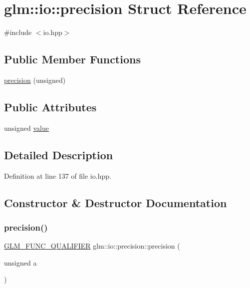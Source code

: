 \hypertarget{structglm_1_1io_1_1precision}{}\section{glm\+:\+:io\+:\+:precision Struct Reference}
\label{structglm_1_1io_1_1precision}


{\ttfamily \#include $<$io.\+hpp$>$}

\subsection*{Public Member Functions}
\begin{DoxyCompactItemize}
\item 
\hyperlink{structglm_1_1io_1_1precision_aa359e1766fd74b88e049d5449d521447}{precision} (unsigned)
\end{DoxyCompactItemize}
\subsection*{Public Attributes}
\begin{DoxyCompactItemize}
\item 
unsigned \hyperlink{structglm_1_1io_1_1precision_a43da772dff9a209768c63f1220d52074}{value}
\end{DoxyCompactItemize}


\subsection{Detailed Description}


Definition at line 137 of file io.\+hpp.



\subsection{Constructor \& Destructor Documentation}
\mbox{\label{structglm_1_1io_1_1precision_aa359e1766fd74b88e049d5449d521447}} 
\subsubsection{\texorpdfstring{precision()}{precision()}}
{\footnotesize\ttfamily \hyperlink{setup_8hpp_a33fdea6f91c5f834105f7415e2a64407}{G\+L\+M\+\_\+\+F\+U\+N\+C\+\_\+\+Q\+U\+A\+L\+I\+F\+I\+ER} glm\+::io\+::precision\+::precision (\begin{DoxyParamCaption}\item[{unsigned}]{a }\end{DoxyParamCaption})\hspace{0.3cm}{\ttfamily [explicit]}}



